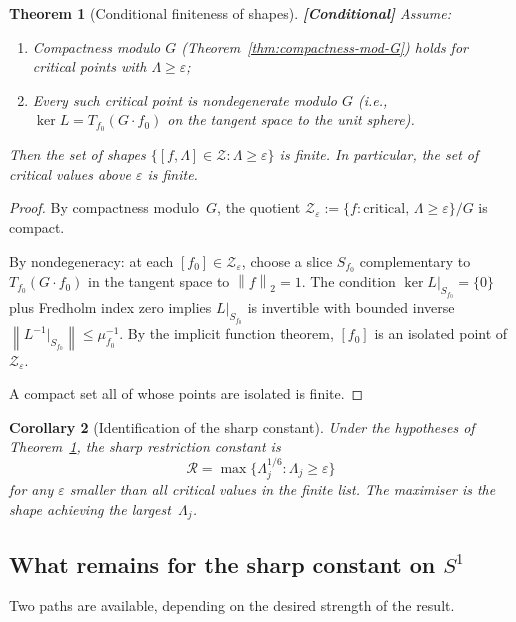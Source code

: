 \documentclass[12pt]{article}
\newtheorem{theorem}{Theorem}[section]
\newtheorem{corollary}[theorem]{Corollary}
\theoremstyle{definition}
\theoremstyle{remark}
\newcommand{\norm}[1]{\left\|#1\right\|}
\newcommand{\conditional}{\textbf{\color{orange}[Conditional]}}
\begin{document}
\begin{theorem}[Conditional finiteness of shapes]
  \label{thm:finiteness}
  \conditional\quad
  Assume:
  \begin{enumerate}[leftmargin=2em]
    \item Compactness modulo $G$ (Theorem~\ref{thm:compactness-mod-G})
      holds for critical points with $\Lambda\geq\varepsilon$;
    \item Every such critical point is nondegenerate modulo $G$
      (i.e., $\ker L=T_{f_0}(G\cdot f_0)$ on the tangent space to the
      unit sphere).
  \end{enumerate}
  Then the set of shapes $\{[f,\Lambda]\in\mathcal Z:\Lambda\geq\varepsilon\}$
  is finite.  In particular, the set of critical values above $\varepsilon$
  is finite.
\end{theorem}

\begin{proof}
  By compactness modulo~$G$, the quotient
  $\mathcal Z_\varepsilon:=\{f:\text{critical},\,\Lambda\geq\varepsilon\}/G$
  is compact.

  By nondegeneracy: at each $[f_0]\in\mathcal Z_\varepsilon$, choose a slice
  $S_{f_0}$ complementary to $T_{f_0}(G\cdot f_0)$ in the tangent space
  to $\norm{f}_2=1$.  The condition $\ker L|_{S_{f_0}}=\{0\}$ plus
  Fredholm index zero implies $L|_{S_{f_0}}$ is invertible with bounded
  inverse $\norm{L^{-1}|_{S_{f_0}}}\leq\mu_{f_0}^{-1}$.  By the
  implicit function theorem, $[f_0]$ is an isolated point of
  $\mathcal Z_\varepsilon$.

  A compact set all of whose points are isolated is finite.
\end{proof}

\begin{corollary}[Identification of the sharp constant]
  Under the hypotheses of Theorem~\ref{thm:finiteness}, the sharp
  restriction constant is
  \[
    \mathcal R = \max\{\Lambda_j^{1/6}:\Lambda_j\geq\varepsilon\}
  \]
  for any $\varepsilon$ smaller than all critical values in the finite list.
  The maximiser is the shape achieving the largest~$\Lambda_j$.
\end{corollary}

\subsection{What remains for the sharp constant on $S^1$}

Two paths are available, depending on the desired strength of the result.
\end{document}
